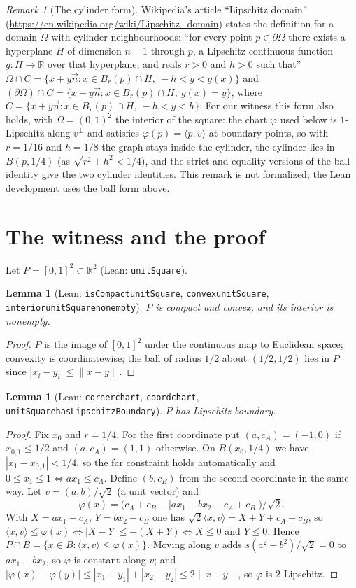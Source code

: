 \documentclass[11pt]{article}
\renewcommand{\_}{\oldus\allowbreak}
\newtheorem{lemma}[theorem]{Lemma}
\theoremstyle{definition}
\theoremstyle{remark}
\newtheorem{remark}[theorem]{Remark}
\begin{document}
\begin{remark}[The cylinder form]
Wikipedia's article ``Lipschitz domain'' (\url{https://en.wikipedia.org/wiki/Lipschitz_domain})
states the definition for a domain $\Omega$ with cylinder neighbourhoods: ``for every point
$p\in\partial\Omega$ there exists a hyperplane $H$ of dimension $n-1$ through $p$, a
Lipschitz-continuous function $g:H\to\mathbb R$ over that hyperplane, and reals $r>0$ and $h>0$
such that'' $\Omega\cap C=\{x+y\vec n: x\in B_r(p)\cap H,\ -h<y<g(x)\}$ and
$(\partial\Omega)\cap C=\{x+y\vec n: x\in B_r(p)\cap H,\ g(x)=y\}$, where $C=\{x+y\vec n: x\in
B_r(p)\cap H,\ -h<y<h\}$. For our witness this form also holds, with $\Omega=(0,1)^2$ the interior
of the square: the chart $\varphi$ used below is $1$-Lipschitz along $v^\perp$ and satisfies
$\varphi(p)=\langle p,v\rangle$ at boundary points, so with $r=1/16$ and $h=1/8$ the graph stays
inside the cylinder, the cylinder lies in $B(p,1/4)$ (as $\sqrt{r^2+h^2}<1/4$), and the strict and
equality versions of the ball identity give the two cylinder identities. This remark is not
formalized; the Lean development uses the ball form above.
\end{remark}

\section{The witness and the proof}
Let $P=[0,1]^2\subset\mathbb R^2$ (Lean: \texttt{unitSquare}).

\begin{lemma}[Lean: \texttt{isCompact\_unitSquare}, \texttt{convex\_unitSquare},
\texttt{interior\_unitSquare\_nonempty}]
$P$ is compact and convex, and its interior is nonempty.
\end{lemma}
\begin{proof}
$P$ is the image of $[0,1]^2$ under the continuous map to Euclidean space; convexity is coordinatewise;
the ball of radius $1/2$ about $(1/2,1/2)$ lies in $P$ since $|x_i-y_i|\le\|x-y\|$.
\end{proof}

\begin{lemma}[Lean: \texttt{corner\_chart}, \texttt{coord\_chart},
\texttt{unitSquare\_hasLipschitzBoundary}]
$P$ has Lipschitz boundary.
\end{lemma}
\begin{proof}
Fix $x_0$ and $r=1/4$. For the first coordinate put $(a,c_A)=(-1,0)$ if $x_{0,1}\le1/2$ and
$(a,c_A)=(1,1)$ otherwise. On $B(x_0,1/4)$ we have $|x_1-x_{0,1}|<1/4$, so the far constraint holds
automatically and $0\le x_1\le1\iff a x_1\le c_A$. Define $(b,c_B)$ from the second coordinate in the
same way. Let $v=(a,b)/\sqrt2$ (a unit vector) and
\[\varphi(x)=\bigl(c_A+c_B-|a x_1-b x_2-c_A+c_B|\bigr)/\sqrt2 .\]
With $X=ax_1-c_A$, $Y=bx_2-c_B$ one has $\sqrt2\langle x,v\rangle=X+Y+c_A+c_B$, so
$\langle x,v\rangle\le\varphi(x)\iff |X-Y|\le-(X+Y)\iff X\le0\text{ and }Y\le0$. Hence
$P\cap B=\{x\in B:\langle x,v\rangle\le\varphi(x)\}$. Moving along $v$ adds $s(a^2-b^2)/\sqrt2=0$
to $ax_1-bx_2$, so $\varphi$ is constant along $v$; and
$|\varphi(x)-\varphi(y)|\le|x_1-y_1|+|x_2-y_2|\le2\|x-y\|$, so $\varphi$ is $2$-Lipschitz.
\end{proof}
\end{document}
